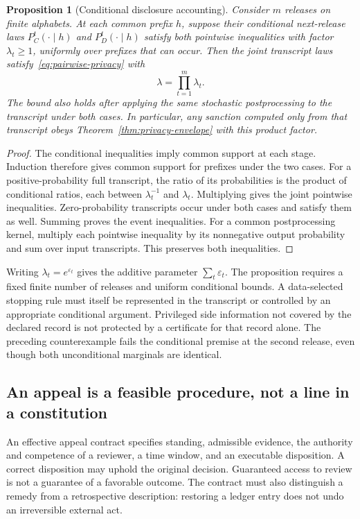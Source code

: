 \documentclass[11pt,letterpaper]{article}
\theoremstyle{plain}
\newtheorem{proposition}{Proposition}[section]
\theoremstyle{definition}
\theoremstyle{remark}
\begin{document}
\begin{proposition}[Conditional disclosure accounting]\label{prop:privacy-transcript}
Consider $m$ releases on finite alphabets. At each common prefix $h$, suppose their conditional next-release laws $P_C^t(\cdot\mid h)$ and $P_D^t(\cdot\mid h)$ satisfy both pointwise inequalities with factor $\lambda_t\ge1$, uniformly over prefixes that can occur. Then the joint transcript laws satisfy~\eqref{eq:pairwise-privacy} with
\[
\lambda=\prod_{t=1}^{m}\lambda_t.
\]
The bound also holds after applying the same stochastic postprocessing to the transcript under both cases. In particular, any sanction computed only from that transcript obeys Theorem~\ref{thm:privacy-envelope} with this product factor.
\end{proposition}
\begin{proof}
The conditional inequalities imply common support at each stage. Induction therefore gives common support for prefixes under the two cases. For a positive-probability full transcript, the ratio of its probabilities is the product of conditional ratios, each between $\lambda_t^{-1}$ and $\lambda_t$. Multiplying gives the joint pointwise inequalities. Zero-probability transcripts occur under both cases and satisfy them as well. Summing proves the event inequalities. For a common postprocessing kernel, multiply each pointwise inequality by its nonnegative output probability and sum over input transcripts. This preserves both inequalities.
\end{proof}

Writing $\lambda_t=e^{\varepsilon_t}$ gives the additive parameter $\sum_t\varepsilon_t$. The proposition requires a fixed finite number of releases and uniform conditional bounds. A data-selected stopping rule must itself be represented in the transcript or controlled by an appropriate conditional argument. Privileged side information not covered by the declared record is not protected by a certificate for that record alone. The preceding counterexample fails the conditional premise at the second release, even though both unconditional marginals are identical.

\subsection{An appeal is a feasible procedure, not a line in a constitution}\label{sec:effective-appeal}

An effective appeal contract specifies standing, admissible evidence, the authority and competence of a reviewer, a time window, and an executable disposition. A correct disposition may uphold the original decision. Guaranteed access to review is not a guarantee of a favorable outcome. The contract must also distinguish a remedy from a retrospective description: restoring a ledger entry does not undo an irreversible external act.
\end{document}
